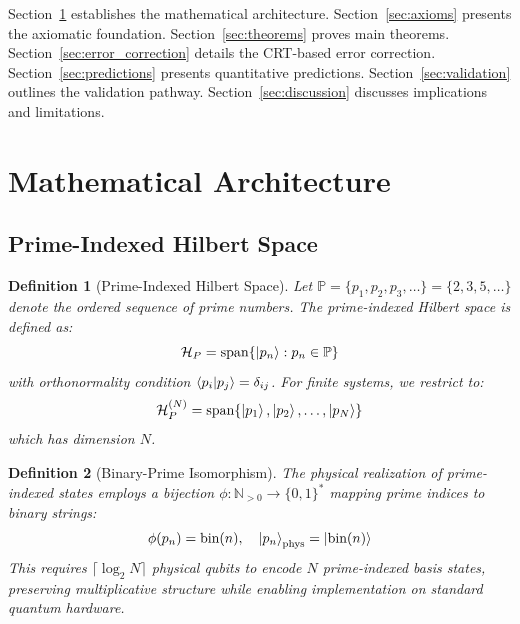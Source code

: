 \documentclass[12pt,a4paper]{article}
\newtheorem{definition}{Definition}[section]
\begin{document}
Section~\ref{sec:math_architecture} establishes the mathematical architecture. Section~\ref{sec:axioms} presents the axiomatic foundation. Section~\ref{sec:theorems} proves main theorems. Section~\ref{sec:error_correction} details the CRT-based error correction. Section~\ref{sec:predictions} presents quantitative predictions. Section~\ref{sec:validation} outlines the validation pathway. Section~\ref{sec:discussion} discusses implications and limitations.

\section{Mathematical Architecture}
\label{sec:math_architecture}

\subsection{Prime-Indexed Hilbert Space}

\begin{definition}[Prime-Indexed Hilbert Space]
\label{def:hilbert}
Let $\mathbb{P} = \{p_1, p_2, p_3, \ldots\} = \{2, 3, 5, \ldots\}$ denote the ordered sequence of prime numbers. The \emph{prime-indexed Hilbert space} is defined as:
\begin{equation}
    \mathcal{H}_P = \text{span}\{\ket{p_n} : p_n \in \mathbb{P}\}
\end{equation}
with orthonormality condition $\braket{p_i}{p_j} = \delta_{ij}$. For finite systems, we restrict to:
\begin{equation}
    \mathcal{H}_P^{(N)} = \text{span}\{\ket{p_1}, \ket{p_2}, \ldots, \ket{p_N}\}
\end{equation}
which has dimension $N$.
\end{definition}

\begin{definition}[Binary-Prime Isomorphism]
\label{def:isomorphism}
The physical realization of prime-indexed states employs a bijection $\phi: \mathbb{N}_{>0} \to \{0,1\}^*$ mapping prime indices to binary strings:
\begin{equation}
    \phi(p_n) = \text{bin}(n), \quad \ket{p_n}_{\text{phys}} = \ket{\text{bin}(n)}
\end{equation}
This requires $\lceil \log_2 N \rceil$ physical qubits to encode $N$ prime-indexed basis states, preserving multiplicative structure while enabling implementation on standard quantum hardware.
\end{definition}
\end{document}
